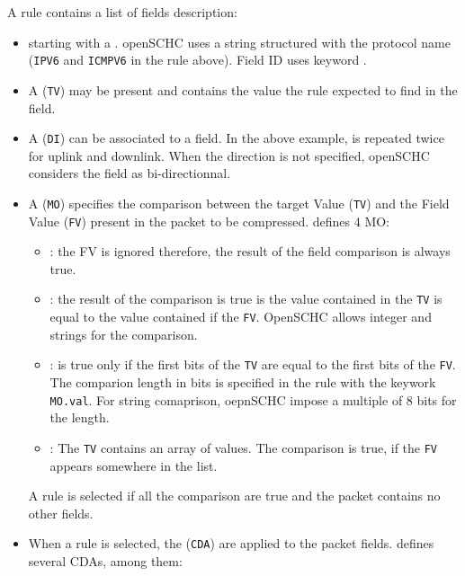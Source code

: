 A rule contains a list of fields description:
\begin{itemize}
    \item starting with a . openSCHC uses a string structured with the protocol name (\texttt{IPV6} and \texttt{ICMPV6} in the rule above). Field ID uses keyword \texttt{}.

    \item A  (\texttt{TV}) may be present and contains the value the rule expected to find in the field.

    \item A  (\texttt{DI}) can be associated to a field. In the above example,  is repeated twice for uplink and downlink. When the direction is not specified, openSCHC considers the field as bi-directionnal.

    \item A  (\texttt{MO}) specifies the comparison between the target Value  (\texttt{TV}) and the Field Value (\texttt{FV}) present in the packet to be compressed.  defines 4 MO:

    \begin{itemize}
    \item \texttt{}: the FV is ignored therefore, the result of the field comparison is always true.
    \item \texttt{}: the result of the comparison is true is the value contained in the \texttt{TV} is equal to the value contained if the \texttt{FV}. OpenSCHC allows integer and strings for the comparison.
    \item \texttt{}: is true only if the first bits of the \texttt{TV} are equal to the first bits of the \texttt{FV}. The comparion length in bits is specified in the rule with the keywork \texttt{MO.val}. For string comaprison, oepnSCHC impose a  multiple of 8 bits for the length.
    \item \texttt{}: The \texttt{TV} contains an array of values. The comparison is true, if the \texttt{FV} appears somewhere in the list.
    \end{itemize}

    A rule is selected if all the comparison are true and the packet contains no other fields. 


    \item When a rule is selected, the  (\texttt{CDA}) are applied to the packet fields.  defines several CDAs, among them:


\end{itemize}

